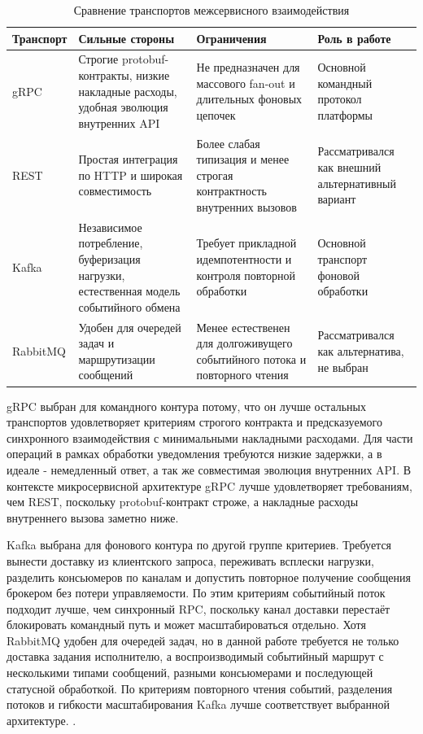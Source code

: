 \begin{table}[H]
    \centering
    \footnotesize
    \renewcommand{\arraystretch}{1.15}
    \caption{Сравнение транспортов межсервисного взаимодействия}
    \label{tab:transport-compare}
    \begin{tabular}{|L{0.16\textwidth}|L{0.25\textwidth}|L{0.24\textwidth}|L{0.25\textwidth}|}
        \hline
        \textbf{Транспорт} & \textbf{Сильные стороны} & \textbf{Ограничения} & \textbf{Роль в работе} \\
        \hline
        gRPC & Строгие protobuf-контракты, низкие накладные расходы, удобная эволюция внутренних API & Не предназначен для массового fan-out и длительных фоновых цепочек & Основной командный протокол платформы \\
        \hline
        REST & Простая интеграция по HTTP и широкая совместимость & Более слабая типизация и менее строгая контрактность внутренних вызовов & Рассматривался как внешний альтернативный вариант \\
        \hline
        Kafka & Независимое потребление, буферизация нагрузки, естественная модель событийного обмена & Требует прикладной идемпотентности и контроля повторной обработки & Основной транспорт фоновой обработки \\
        \hline
        RabbitMQ & Удобен для очередей задач и маршрутизации сообщений & Менее естественен для долгоживущего событийного потока и повторного чтения & Рассматривался как альтернатива, не выбран \\
        \hline
    \end{tabular}
\end{table}

gRPC выбран для командного контура потому, что он лучше остальных транспортов удовлетворяет критериям строгого контракта и предсказуемого синхронного взаимодействия с минимальными накладными расходами. Для части операций в рамках обработки уведомления требуются низкие задержки, а в идеале - немедленный ответ, а так же совместимая эволюция внутренних API. В контексте микросервисной архитектуре gRPC лучше удовлетворяет требованиям, чем REST, поскольку protobuf-контракт строже, а накладные расходы внутреннего вызова заметно ниже.

Kafka выбрана для фонового контура по другой группе критериев. Требуется вынести доставку из клиентского запроса, переживать всплески нагрузки, разделить консьюмеров по каналам и допустить повторное получение сообщения брокером без потери управляемости. По этим критериям событийный поток подходит лучше, чем синхронный RPC, поскольку канал доставки перестаёт блокировать командный путь и может масштабироваться отдельно. Хотя RabbitMQ удобен для очередей задач, но в данной работе требуется не только доставка задания исполнителю, а воспроизводимый событийный маршрут с несколькими типами сообщений, разными консьюмерами и последующей статусной обработкой. По критериям повторного чтения событий, разделения потоков и гибкости масштабирования Kafka лучше соответствует выбранной архитектуре.  \cite{grpc_docs,kafka_in_action}.

